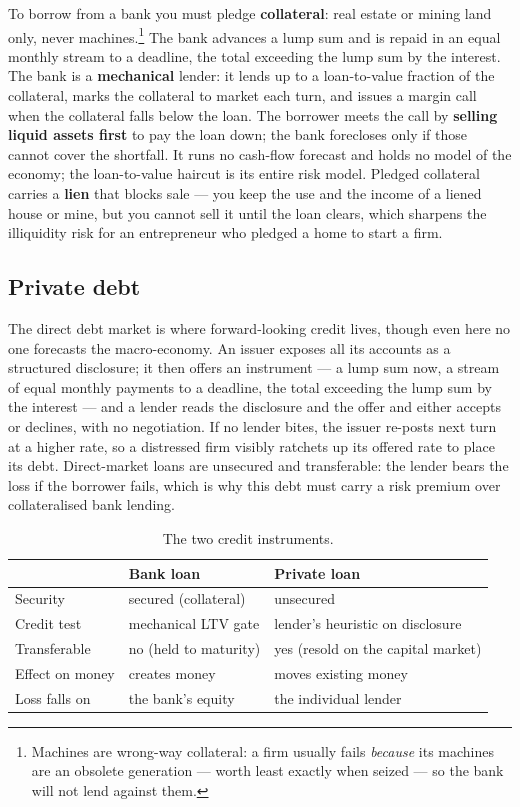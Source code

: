 \documentclass[11pt]{article}
\begin{document}
To borrow from a bank you must pledge \textbf{collateral}: real estate or mining
land only, never machines.\footnote{Machines are wrong-way collateral: a firm
usually fails \emph{because} its machines are an obsolete generation --- worth
least exactly when seized --- so the bank will not lend against them.} The bank
advances a lump sum and is repaid in an equal monthly stream to a deadline, the
total exceeding the lump sum by the interest. The bank is a \textbf{mechanical}
lender: it lends up to a loan-to-value fraction of the collateral, marks the
collateral to market each turn, and issues a margin call when the collateral
falls below the loan. The borrower meets the call by \textbf{selling liquid
assets first} to pay the loan down; the bank forecloses only if those cannot
cover the shortfall. It runs no cash-flow forecast and holds no model of the economy; the
loan-to-value haircut is its entire risk model. Pledged collateral carries a
\textbf{lien} that blocks sale --- you keep the use and the income of a liened
house or mine, but you cannot sell it until the loan clears, which sharpens the
illiquidity risk for an entrepreneur who pledged a home to start a firm.

\subsection{Private debt}
\label{sec:private-debt}

The direct debt market is where forward-looking credit lives, though even here
no one forecasts the macro-economy. An issuer exposes all its accounts as a
structured disclosure; it then offers an instrument --- a lump sum now, a stream
of equal monthly payments to a deadline, the total exceeding the lump sum by the
interest --- and a lender reads the disclosure and the offer and either accepts
or declines, with no negotiation. If no lender bites, the issuer re-posts next
turn at a higher rate, so a distressed firm visibly ratchets up its offered rate
to place its debt. Direct-market loans are unsecured and transferable: the
lender bears the loss if the borrower fails, which is why this debt must carry a
risk premium over collateralised bank lending.

\begin{table}[h]
\centering
\small
\begin{tabular}{@{}lll@{}}
\toprule
 & \textbf{Bank loan} & \textbf{Private loan} \\
\midrule
Security      & secured (collateral)       & unsecured \\
Credit test   & mechanical LTV gate        & lender's heuristic on disclosure \\
Transferable  & no (held to maturity)      & yes (resold on the capital market) \\
Effect on money & creates money            & moves existing money \\
Loss falls on & the bank's equity          & the individual lender \\
\bottomrule
\end{tabular}
\caption{The two credit instruments.}
\end{table}
\end{document}
